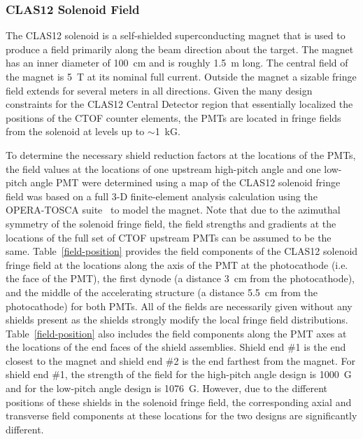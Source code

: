 \documentclass{elsart}
\begin{document}
\subsubsection{CLAS12 Solenoid Field}

The CLAS12 solenoid is a self-shielded superconducting magnet that is used to produce a field 
primarily along the beam direction about the target. The magnet has an inner diameter of 100~cm 
and is roughly 1.5~m long. The central field of the magnet is 5~T at its nominal full current. 
Outside the magnet a sizable fringe field extends for several meters in all directions. Given 
the many design constraints for the CLAS12 Central Detector region that essentially localized 
the positions of the CTOF counter elements, the PMTs are located in fringe fields from the 
solenoid at levels up to $\sim$1~kG.

To determine the necessary shield reduction factors at the locations of the PMTs, the field
values at the locations of one upstream high-pitch angle and one low-pitch angle PMT were
determined using a map of the CLAS12 solenoid fringe field was based on a full 3-D 
finite-element analysis calculation using the OPERA-TOSCA suite~\cite{opera} to model the 
magnet. Note that due to the azimuthal symmetry of the solenoid fringe field, the field 
strengths and gradients at the locations of the full set of CTOF upstream PMTs can be assumed 
to be the same. Table~\ref{field-position} provides the field components of the CLAS12 
solenoid fringe field at the locations along the axis of the PMT at the photocathode (i.e. 
the face of the PMT), the first dynode (a distance 3~cm from the photocathode), and the middle 
of the accelerating structure (a distance 5.5~cm from the photocathode) for both PMTs. All of 
the fields are necessarily given without any shields present as the shields strongly modify the 
local fringe field distributions. Table~\ref{field-position} also includes the field components 
along the PMT axes at the locations of the end faces of the shield assemblies. Shield end \#1 
is the end closest to the magnet and shield end \#2 is the end farthest from the magnet. For 
shield end \#1, the strength of the field for the high-pitch angle design is 1000~G and for the 
low-pitch angle design is 1076~G. However, due to the different positions of these shields in 
the solenoid fringe field, the corresponding axial and transverse field components at these 
locations for the two designs are significantly different.
\end{document}
